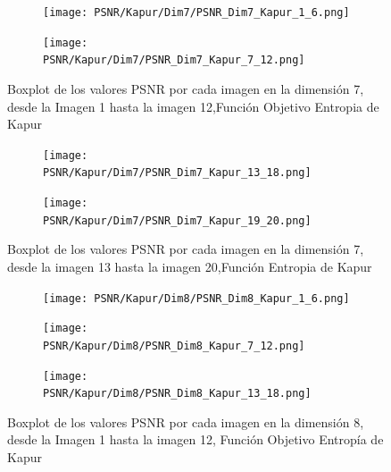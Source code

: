 \documentclass[conference]{IEEEtran}
\begin{document}
\begin{figure}[htbp]
	\centering
	
	\begin{subfigure}{0.5\textwidth}
		\texttt{[image: PSNR/Kapur/Dim7/PSNR\_Dim7\_Kapur\_1\_6.png]}
	\end{subfigure}
	
	\begin{subfigure}{0.5\textwidth}
		\texttt{[image: PSNR/Kapur/Dim7/PSNR\_Dim7\_Kapur\_7\_12.png]}
	\end{subfigure}
	\caption{Boxplot de los valores PSNR por cada imagen en la dimensión 7, desde la Imagen 1 hasta la imagen 12,Función Objetivo Entropia de Kapur}
	\label{fig:imagenes}    
\end{figure}

\begin{figure}[htbp]
	\centering
	\begin{subfigure}{0.5\textwidth}
		\texttt{[image: PSNR/Kapur/Dim7/PSNR\_Dim7\_Kapur\_13\_18.png]}
	\end{subfigure}   
	\begin{subfigure}{0.5\textwidth}
		\texttt{[image: PSNR/Kapur/Dim7/PSNR\_Dim7\_Kapur\_19\_20.png]}
		\vspace{-150pt} %
	\end{subfigure}
	\caption{Boxplot de los valores PSNR por cada imagen en la dimensión 7, desde la imagen 13 hasta la imagen 20,Función Entropia de Kapur}
	\label{fig:imagenes}    
\end{figure}

\begin{figure}[htbp] %
	\centering %
	\begin{subfigure}{0.5\textwidth}
		\centering %
		\texttt{[image: PSNR/Kapur/Dim8/PSNR\_Dim8\_Kapur\_1\_6.png]}
	\end{subfigure}%
	\begin{subfigure}{0.5\textwidth}
		\centering
		\texttt{[image: PSNR/Kapur/Dim8/PSNR\_Dim8\_Kapur\_7\_12.png]}
	\end{subfigure}
		\begin{subfigure}{0.5\textwidth}
		\centering
		\texttt{[image: PSNR/Kapur/Dim8/PSNR\_Dim8\_Kapur\_13\_18.png]}
	\end{subfigure}%
	\caption{Boxplot de los valores PSNR por cada imagen en la dimensión 8, desde la Imagen 1 hasta la imagen 12, Función Objetivo Entropía de Kapur}
	\label{fig:imagenes_dim8_1_12}    
\end{figure}
\end{document}

